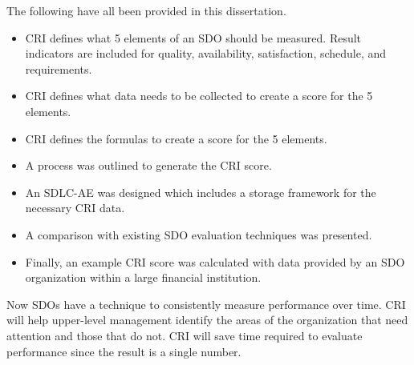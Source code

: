 \documentclass[SDSUThesis.tex]{subfiles}
\begin{document}
    The following have all been provided in this dissertation.
    \begin{itemize}
        \item CRI defines what 5 elements of an SDO should be measured.
            Result indicators are included for quality, availability, satisfaction,
            schedule, and requirements. 
        \item CRI defines what data needs to be collected to create a 
            score for the 5 elements.
        \item CRI defines the formulas to create a score for the 5 elements.
        \item A process was outlined to generate the CRI score.
        \item An SDLC-AE was designed which includes a storage 
            framework for the necessary CRI data.
        \item A comparison with existing SDO evaluation techniques was presented.
        \item Finally, an example CRI score was calculated with data provided by
            an SDO organization within a large financial institution.
    \end{itemize}
    
    Now SDOs have a technique to consistently measure performance over time.  CRI
    will help upper-level management identify the areas of the organization
    that need attention and those that do not.  CRI will save time required to 
    evaluate performance since the result is a single number.  
    
    
\end{document}
